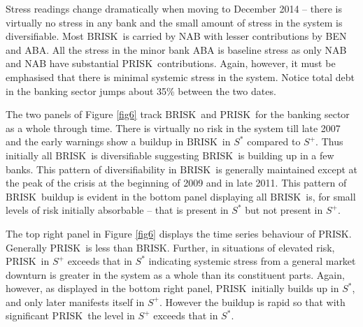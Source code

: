 \documentclass[authoryear]{elsarticle}
\newcommand{\br}{\ensuremath{\mathrm{BRISK}}}
\newcommand{\pr}{\ensuremath{\mathrm{PRISK}}}
\newcommand{\fref}[1]{Figure \ref{#1}}
\begin{document}
Stress readings  change dramatically when moving to December 2014 -- there is virtually no stress in any bank and the small amount of  stress in the system is diversifiable.    Most  \br\ is carried by NAB with lesser contributions by BEN and ABA.    All the stress in the minor bank ABA is baseline stress as only NAB and NAB have substantial \pr\  contributions.   Again, however, it must be emphasised that there is minimal systemic stress in the system.  Notice total debt in the banking sector  jumps about 35\% between the two dates.

The two  panels of \fref{fig6} track  \br\ and \pr\ for the banking sector as a whole through time.   There is virtually no risk in the system till late 2007 and the early warnings show a buildup in \br\ in $S^*$ compared to $S^+$.   Thus initially all \br\ is diversifiable suggesting \br\ is building up in a few banks.   This pattern of diversifiability in \br\ is generally maintained except at the peak of the crisis at the beginning of 2009 and in late 2011.  This pattern of \br\ buildup is evident in the bottom panel displaying all \br\ is, for small levels of risk initially absorbable -- that is present in $S^*$ but not present in $S^+$. 

The top right panel in \fref{fig6} displays the time series behaviour of \pr.  Generally \pr\ is less than \br.   Further, in situations of elevated risk,  \pr\ in $S^+$ exceeds that in $S^*$ indicating systemic stress from a general market downturn is greater in the system as a whole than its constituent parts.   Again, however, as displayed in the bottom right panel, \pr\ initially builds up in $S^*$, and only later manifests itself in $S^+$.  However the buildup is rapid so that with significant \pr\ the level in $S^+$ exceeds that in $S^*$.
\end{document}
